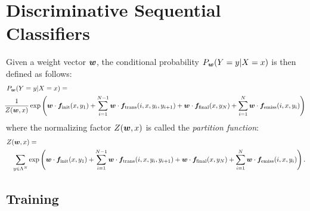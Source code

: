 %

\section{Discriminative Sequential Classifiers}

Given a weight vector $\boldsymbol{w}$, the conditional probability $P_{\boldsymbol{w}}(Y=y|X=x)$ is then defined as follows: 
\begin{eqnarray}
\lefteqn{P_{\W}(Y=y|X=x) =}\nonumber\\
&&
\!\!\!\!\!\!\!\!\frac{1}{Z({\W},x)}\exp\left(\W \cdot \F_{\mathrm{init}}(x,y_1) + 
\sum_{i=1}^{N-1} \W \cdot \F_{\mathrm{trans}}(i,x,y_i,y_{i+1})
+
\W \cdot \F_{\mathrm{final}}(x,y_N)
+
\sum_{i=1}^{N} \W \cdot \F_{\mathrm{emiss}}(i,x,y_i)
\right) \label{eq:disc_formula}
\end{eqnarray}
where the normalizing factor $Z(\boldsymbol{w},x)$ is called the \emph{partition function}:
\begin{eqnarray}
\lefteqn{Z(\W,x) =}\nonumber\\ 
&& 
\sum_{y\in \statevocab^N} \exp\left(\W \cdot \F_{\mathrm{init}}(x,y_1) + 
\sum_{i=1}^{N-1} \W \cdot \F_{\mathrm{trans}}(i,x,y_i,y_{i+1})
+
\W \cdot \F_{\mathrm{final}}(x,y_N)
+
\sum_{i=1}^{N} \W \cdot \F_{\mathrm{emiss}}(i,x,y_i)
\right).
\end{eqnarray}


\subsection{Training}

